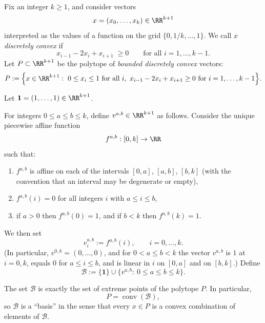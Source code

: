 \begin{definition}
    Fix an integer $k\ge1$, and consider vectors
    \[
        x=(x_0,\dots,x_k)\in\RR^{k+1}
    \]
    interpreted as the values of a function on the grid $\{0,1/k,\dots,1\}$.
    We call $x$ \emph{discretely convex} if
    \[
        x_{i-1}-2x_i+x_{i+1}\;\ge 0\qquad\text{for all }i=1,\dots,k-1.
    \]
    Let $P\subset\RR^{k+1}$ be the polytope of \emph{bounded discretely convex} vectors:
    \[
        P:=\Bigl\{x\in\RR^{k+1}:\ 0\le x_i\le1\ \text{for all }i,\
        x_{i-1}-2x_i+x_{i+1}\ge0\ \text{for }i=1,\dots,k-1\Bigr\}.
    \]
\end{definition}

\begin{definition}
    Let $\mathbf{1}=(1,\dots,1)\in\RR^{k+1}$.

    For integers $0\le a\le b\le k$, define $v^{a,b}\in\RR^{k+1}$ as follows.
    Consider the unique piecewise affine function
    \[
        f^{a,b}:[0,k]\to\RR
    \]
    such that:
    \begin{enumerate}
        \item $f^{a,b}$ is affine on each of the intervals $[0,a]$, $[a,b]$, $[b,k]$ (with the convention that an interval may be degenerate or empty),
        \item $f^{a,b}(i)=0$ for all integers $i$ with $a\le i\le b$,
        \item if $a>0$ then $f^{a,b}(0)=1$, and if $b<k$ then $f^{a,b}(k)=1$.
    \end{enumerate}
    We then set
    \[
        v^{a,b}_i := f^{a,b}(i),\qquad i=0,\dots,k.
    \]
    (In particular, $v^{0,k}=(0,\dots,0)$, and for $0<a\le b<k$ the vector
    $v^{a,b}$ is $1$ at $i=0,k$, equals $0$ for $a\le i\le b$, and is linear in $i$
    on $[0,a]$ and on $[b,k]$.)
    Define
    \[
        \mathcal{B}:=\{\mathbf{1}\}\cup\{v^{a,b}:\ 0\le a\le b\le k\}.
    \]
\end{definition}

\begin{theorem}
    The set $\mathcal{B}$ is exactly the set of extreme points of the polytope $P$.
    In particular,
    \[
        P = \operatorname{conv}(\mathcal{B}),
    \]
    so $\mathcal{B}$ is a ``basis'' in the sense that every $x\in P$ is a convex combination of elements of $\mathcal{B}$.
\end{theorem}

